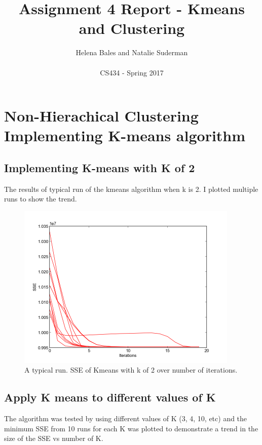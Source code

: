 \documentclass[letterpaper,10pt]{article}
\title{Assignment 4 Report - Kmeans and Clustering}
\author{Helena Bales and Natalie Suderman\\ \\ CS434 - Spring 2017}
\begin{document}
\maketitle

\tableofcontents
\clearpage


\section{Non-Hierachical Clustering Implementing K-means algorithm}

\subsection{Implementing K-means with K of 2}
	The results of  typical run of the kmeans algorithm when k is 2. I plotted multiple runs to show the trend.
     \begin{figure}[ht]
    \centering
   \includegraphics[width=300pt]{k2means.png}
    \caption{A typical run. SSE of Kmeans with k of 2 over number of iterations.}
    \label{fig:k2}
    \end{figure}	

\subsection{Apply K means to different values of K}
The algorithm was tested by using different values of K (3, 4, 10, etc) 
and the minimum SSE from 10 runs for each K was plotted to demonstrate 
a trend in the size of the SSE vs number of K. 
\end{document}
